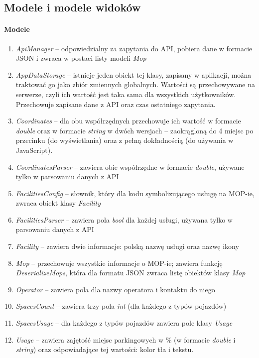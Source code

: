 \subsection{Modele i modele widoków}
\paragraph{Modele}
\begin{enumerate}
\item \textit{ApiManager} -- odpowiedzialny za zapytania do API, pobiera dane w formacie JSON i zwraca w postaci listy modeli \textit{Mop}
\item \textit{AppDataStorage} -- istnieje jeden obiekt tej klasy, zapisany w aplikacji, można traktować go jako zbiór zmiennych globalnych. Wartości są przechowywane na serwerze, czyli ich wartość jest taka sama dla wszystkich użytkowników. Przechowuje zapisane dane z API oraz czas ostatniego zapytania.
\item \textit{Coordinates} -- dla obu współrzędnych przechowuje ich wartość w formacie \textit{double} oraz w formacie \textit{string} w dwóch wersjach -- zaokrągloną do 4 miejsc po przecinku (do wyświetlania) oraz z pełną dokładnością (do używania w JavaScript). 
\item \textit{CoordinatesParser} -- zawiera obie współrzędne w formacie \textit{double}, używane tylko w parsowaniu danych z API
\item \textit{FacilitiesConfig} -- słownik, który dla kodu symbolizującego usługę na MOP-ie, zwraca obiekt klasy \textit{Facility}
\item \textit{FacilitiesParser} -- zawiera pola \textit{bool} dla każdej usługi, używana tylko w parsowaniu danych z API
\item \textit{Facility} -- zawiera dwie informacje: polską nazwę usługi oraz nazwę ikony
\item \textit{Mop} -- przechowuje wszystkie informacje o MOP-ie; zawiera funkcję \textit{DeserializeMops}, która dla formatu JSON zwraca listę obiektów klasy \textit{Mop}
\item \textit{Operator} -- zawiera pola dla nazwy operatora i kontaktu do niego
\item \textit{SpacesCount} -- zawiera trzy pola \textit{int} (dla każdego z typów pojazdów)
\item \textit{SpacesUsage} -- dla każdego z typów pojazdów zawiera pole klasy \textit{Usage}
\item \textit{Usage} -- zawiera zajętość miejsc parkingowych w \% (w formacie \textit{double} i \textit{string}) oraz odpowiadające tej wartości: kolor tła i tekstu.
\end{enumerate}

